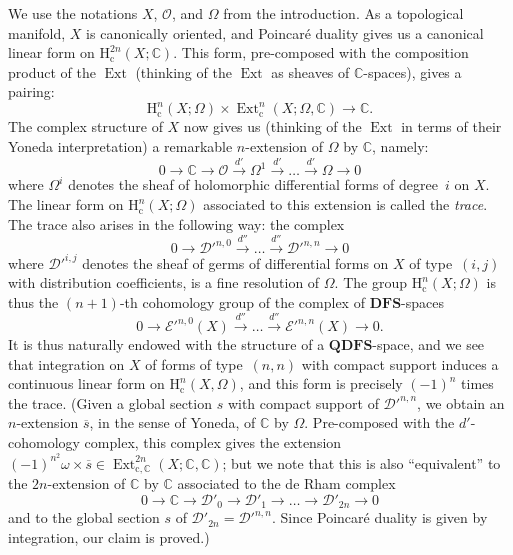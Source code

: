 \documentclass[british]{article}
\newcommand{\oldpage}[1]{\marginpar{\footnotesize$\Big\vert$ \textit{p.~#1}}}
\begin{document}
We use the notations \(X\), \({\mathscr{O}}\), and \(\Omega\) from the
introduction. As a topological manifold, \(X\) is canonically oriented,
and Poincaré duality gives us a canonical linear form on
\(\mathrm{H}_\mathrm{c}^{2n}(X;\mathbb{C})\). This form, pre-composed
with the composition product of the \(\operatorname{Ext}\) (thinking of
the \(\operatorname{Ext}\) as sheaves of \(\mathbb{C}\)-spaces), gives a
pairing: \[
  \mathrm{H}_\mathrm{c}^n(X;\Omega) \times \operatorname{Ext}_\mathrm{c}^n(X;\Omega,\mathbb{C})
\to \mathbb{C}.
\] The complex structure of \(X\) now gives us (thinking of the
\(\operatorname{Ext}\) in terms of their Yoneda interpretation) a
remarkable \(n\)-extension of \(\Omega\) by \(\mathbb{C}\), namely: \[
  0 \to \mathbb{C} \to {\mathscr{O}}\xrightarrow{d'} \Omega^1 \xrightarrow{d'} \ldots \xrightarrow{d'} \Omega \to 0
\] where \(\Omega^i\) denotes the sheaf of holomorphic differential
forms of degree~\(i\) on \(X\). The linear form on
\(\mathrm{H}_\mathrm{c}^n(X;\Omega)\) associated to this extension is
called the \emph{trace}. The trace also arises in the following way: the
complex \[
  0 \to {{\mathscr{D}}'}^{n,0} \xrightarrow{d''} \ldots \xrightarrow{d''} {{\mathscr{D}}'}^{n,n} \to 0
\tag{1}
\] where \({{\mathscr{D}}'}^{i,j}\) denotes the sheaf of germs of
differential forms on \(X\) of type~\((i,j)\) with distribution
coefficients, is a fine resolution of \(\Omega\). The group
\(\mathrm{H}_\mathrm{c}^n(X;\Omega)\) is thus the \((n+1)\)-th
cohomology group of the complex of \(\mathbf{DFS}\)-spaces \oldpage{80}
\[
  0 \to {{\mathscr{E}}'}^{n,0}(X) \xrightarrow{d''} \ldots \xrightarrow{d''} {{\mathscr{E}}'}^{n,n}(X) \to 0.
\tag{2}
\] It is thus naturally endowed with the structure of a
\(\mathbf{QDFS}\)-space, and we see that integration on \(X\) of forms
of type~\((n,n)\) with compact support induces a continuous linear form
on \(\mathrm{H}_\mathrm{c}^n(X,\Omega)\), and this form is precisely
\((-1)^n\) times the trace. (Given a global section \(s\) with compact
support of \({{\mathscr{D}}'}^{n,n}\), we obtain \autocite{4} an
\(n\)-extension \(\overline{s}\), in the sense of Yoneda, of
\(\mathbb{C}\) by \(\Omega\). Pre-composed with the \(d'\)-cohomology
complex, this complex gives the extension
\((-1)^{n^2}\omega\times\overline{s}\in\operatorname{Ext}_{\mathrm{c},\mathbb{C}}^{2n}(X;\mathbb{C},\mathbb{C})\);
but we note that this is also ``equivalent'' to the \(2n\)-extension of
\(\mathbb{C}\) by \(\mathbb{C}\) associated to the de Rham complex
\[0\to\mathbb{C}\to{\mathscr{D}}'_0\to{\mathscr{D}}'_1\to\ldots\to{\mathscr{D}}'_{2n}\to0\]
and to the global section \(s\) of
\({\mathscr{D}}'_{2n}={{\mathscr{D}}'}^{n,n}\). Since Poincaré duality
is given by integration, our claim is proved.)
\end{document}

